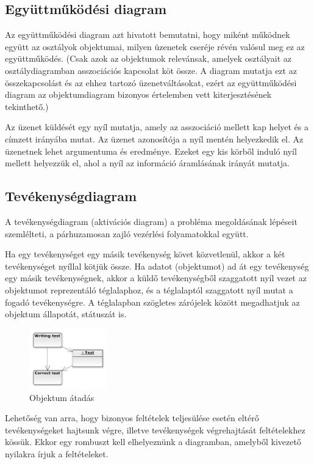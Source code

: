 \documentclass[margin=0px]{article}
\begin{document}
		\subsection{Együttműködési diagram}
			Az együttműködési diagram azt hivatott bemutatni, hogy miként működnek együtt az osztályok objektumai, milyen üzenetek cseréje révén valósul meg ez az együttműködés.
			(Csak azok az objektumok relevánsak, amelyek osztályait az osztálydiagramban asszociációs kapcsolat köt össze. A diagram mutatja ezt az összekapcsolást és az ehhez tartozó
			üzenetváltásokat, ezért az együttműködési diagram az objektumdiagram bizonyos értelemben vett kiterjesztésének tekinthető.)
			
			Az üzenet küldését egy nyíl mutatja, amely az asszociáció mellett kap helyet és a címzett irányába mutat. Az üzenet azonosítója a nyíl mentén helyezkedik el. Az üzenetnek lehet argumentuma és eredménye. Ezeket egy kis körből induló nyíl mellett helyezzük el, ahol a nyíl az információ áramlásának irányát mutatja.
			
			
		\subsection{Tevékenységdiagram}
			A tevékenységdiagram (aktivációs diagram) a probléma megoldásának lépéseit szemlélteti, a párhuzamosan zajló vezérlési folyamatokkal együtt.
			
			Ha egy tevékenységet
			egy másik tevékenység követ közvetlenül, akkor a két tevékenységet
			nyíllal kötjük össze. Ha adatot (objektumot) ad át egy tevékenység
			egy másik tevékenységnek, akkor a küldő tevékenységből szaggatott
			nyíl vezet az objektumot reprezentáló téglalaphoz, és a téglalaptól
			szaggatott nyíl mutat a fogadó tevékenységre. A téglalapban szögletes
			zárójelek között megadhatjuk az objektum állapotát, státuszát is.
			\begin{figure}[H]
				\centering
				\includegraphics[width=0.3\textwidth]{img/tevekenyseg.png}
				\caption{Objektum átadás}
			\end{figure}
			
			Lehetőség van arra, hogy bizonyos feltételek teljesülése esetén eltérő
			tevékenységeket hajtsunk végre, illetve tevékenységek végrehajtását
			feltételekhez kössük. Ekkor egy rombuszt kell elhelyeznünk a diagramban,
			amelyből kivezető nyilakra írjuk a feltételeket.
			
\end{document}
